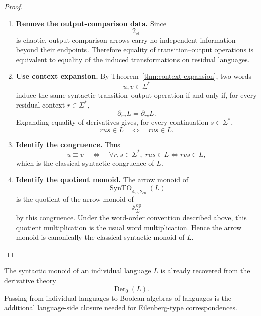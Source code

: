 \begin{proof}
    \leavevmode
    \begin{enumerate}
        \item \textbf{Remove the output-comparison data.}
        Since
        \[
            2_{\mathrm{ch}}
        \]
        is chaotic, output-comparison arrows carry no independent information
        beyond their endpoints. Therefore equality of transition--output
        operations is equivalent to equality of the induced transformations on
        residual languages.

        \item \textbf{Use context expansion.}
        By Theorem~\ref{thm:context-expansion}, two words
        \[
            u,v\in\Sigma^*
        \]
        induce the same syntactic transition--output operation if and only if,
        for every residual context \(r\in\Sigma^*\),
        \[
            \partial_{ru}L=\partial_{rv}L.
        \]
        Expanding equality of derivatives gives, for every continuation
        \(s\in\Sigma^*\),
        \[
            rus\in L
            \quad\Longleftrightarrow\quad
            rvs\in L.
        \]

        \item \textbf{Identify the congruence.}
        Thus
        \[
            u\equiv v
            \quad\Longleftrightarrow\quad
            \forall r,s\in\Sigma^*,\;
            rus\in L\Longleftrightarrow rvs\in L,
        \]
        which is the classical syntactic congruence of \(L\).

        \item \textbf{Identify the quotient monoid.}
        The arrow monoid of
        \[
            \operatorname{SynTO}_{\mathbb A_\Sigma,2_{\mathrm{ch}}}(L)
        \]
        is the quotient of the arrow monoid of
        \[
            \mathbb A_\Sigma^{\mathrm{op}}
        \]
        by this congruence. Under the word-order convention described above,
        this quotient multiplication is the usual word multiplication. Hence
        the arrow monoid is canonically the classical syntactic monoid of \(L\).
    \end{enumerate}
\end{proof}

\begin{remark}
\label{rem:boolean-closure-varieties}
    The syntactic monoid of an individual language \(L\) is already recovered
    from the derivative theory
    \[
        \operatorname{Der}_0(L).
    \]
    Passing from individual languages to Boolean algebras of languages is the
    additional language-side closure needed for Eilenberg-type correspondences.
\end{remark}

